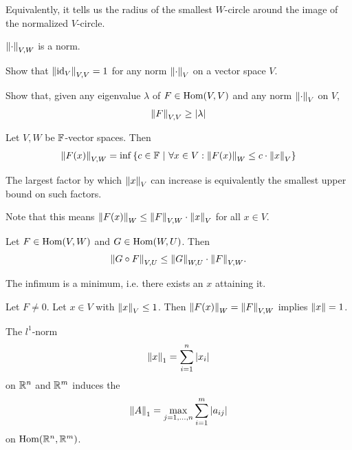 Equivalently, it tells us the radius of the smallest $W$-circle around the image of the normalized $V$-circle.
\begin{theorem}
	$\norm{\cdot}_{V,W}$ is a norm.
\end{theorem}
\begin{exercise}
	Show that $\norm{\operatorname{id}_V}_{V,V} = 1$ for any norm $\norm{\cdot}_V$ on a vector space $V$.
\end{exercise}
\begin{exercise}
	Show that, given any eigenvalue $\lambda$ of $F \in \textnormal{Hom}(V,V)$ and any norm $\norm{\cdot}_V$ on $V$, 
	\begin{align*}
		\norm{F}_{V,V} \geq \abs{\lambda}
	\end{align*}
\end{exercise}
\begin{theorem}
	Let $V,W$ be $\mathbb{F}$-vector spaces. Then
	\begin{align*}
		\norm{F(x)}_{V,W} = \inf \lr{c \in \bF \mid \forall x \in V : \norm{F(x)}_W \leq c \cdot \norm{x}_V}
	\end{align*}
\end{theorem}
\begin{proofsketch}
	The largest factor by which $\norm{x}_V$ can increase is equivalently the smallest upper bound on such factors.
\end{proofsketch}
Note that this means $\norm{F(x)}_W \leq \norm{F}_{V,W} \cdot \norm{x}_V$ for all $x \in V$.
\begin{corollary}
	Let $F \in \textnormal{Hom}(V,W)$ and $G \in \textnormal{Hom}(W,U)$. Then $$\norm{G \circ F}_{V,U} \leq \norm{G}_{W,U} \cdot \norm{F}_{V,W}.$$
\end{corollary}
\begin{lemma}
	The infimum is a minimum, i.e. there exists an $x$ attaining it.
\end{lemma}
\begin{lemma}
	Let $F \neq 0$. Let $x \in V$ with $\norm{x}_V \leq 1$. Then $\norm{F(x)}_W = \norm{F}_{V,W}$ implies $\norm{x} = 1$.
\end{lemma}
\begin{proposition}
	The $l^1$-norm
	\begin{align*}
		\norm{x}_1 = \sum_{i = 1}^n \abs{x_i}
	\end{align*} 
	on $\mathbb{R}^n$ and $\mathbb{R}^m$ induces the 
	\begin{align*}
		\norm{A}_1 = \max_{j = 1, \hdots, n} \sum_{i = 1}^m \abs{a_{ij}}
	\end{align*}
	on $\textnormal{Hom}(\mathbb{R}^n, \mathbb{R}^m)$.
\end{proposition}
